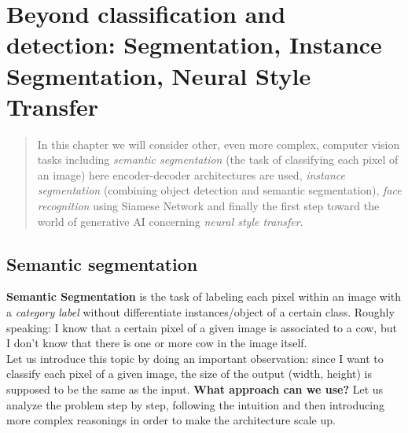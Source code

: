 \chapter[Segmentation and Neural Style Transfer]{Beyond classification and detection: Segmentation, Instance Segmentation,  Neural Style Transfer}

\begin{quotation}
    \noindent
    \textsf{In this chapter we will consider other, even more  complex, computer vision tasks including \textit{semantic segmentation} (the task of classifying each pixel of an image) here encoder-decoder architectures are used, \textit{instance segmentation} (combining object detection and semantic segmentation), \textit{face recognition} using Siamese Network and finally the first step toward the world of generative AI concerning \textit{neural style transfer}.
    }
\end{quotation}

\section{Semantic segmentation}
\textbf{Semantic Segmentation} is the task of labeling each pixel within an image with a \textit{category label} without differentiate instances/object of a certain class. Roughly speaking: I know that a certain pixel of a given image is associated to a cow, but I don't know that there is one or more cow in the image itself. \\
Let us introduce this topic by doing an important observation: since I want to classify each pixel of a given image, the size of the output (width, height) is supposed to be the same as the input. \textbf{What approach can we use?} Let us analyze the problem step by step, following the intuition and then introducing more complex reasonings in order to make the architecture scale up. 

